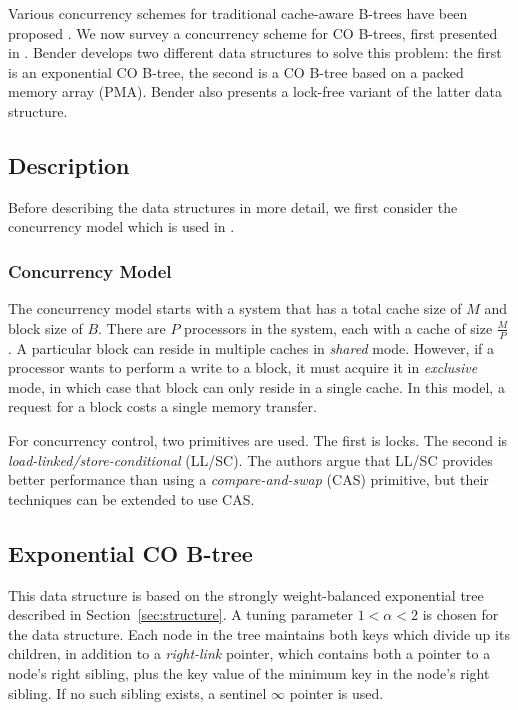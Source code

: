 \documentclass[preprint]{style}
\begin{document}
Various concurrency schemes for traditional cache-aware B-trees have been
proposed \cite{BayerS77, LehmanY81}. We now survey a concurrency scheme for CO
B-trees, first presented in \cite{BenderFiGi05}. Bender develops two different
data structures to solve this problem: the first is an exponential CO B-tree,
the second is a CO B-tree based on a packed memory array (PMA). Bender also
presents a lock-free variant of the latter data structure.

\newpage
\subsection{Description}

Before describing the data structures in more detail, we first consider
the concurrency model which is used in \cite{BenderFiGi05}.

\subsubsection{Concurrency Model}

The concurrency model starts with a system that has a total cache size of $M$
and block size of $B$. There are $P$ processors in the system, each with a
cache of size $\frac{M}{P}$. A particular block can reside in multiple caches
in \textit{shared} mode. However, if a processor wants to perform a write to a
block, it must acquire it in \textit{exclusive} mode, in which case that block
can only reside in a single cache. In this model, a request for a block costs
a single memory transfer.

For concurrency control, two primitives are used. The first is locks. The
second is \textit{load-linked/store-conditional} (LL/SC). The authors argue
that LL/SC provides better performance than using a \textit{compare-and-swap}
(CAS) primitive, but their techniques can be extended to use CAS.

\subsection{Exponential CO B-tree}

This data structure is based on the strongly weight-balanced exponential tree
described in Section~\ref{sec:structure}. A tuning parameter $1 < \alpha < 2$
is chosen for the data structure. Each node in the tree maintains both keys
which divide up its children, in addition to a \textit{right-link} pointer,
which contains both a pointer to a node's right sibling, plus the key value of
the minimum key in the node's right sibling. If no such sibling exists, a
sentinel $\infty$ pointer is used.
\end{document}
